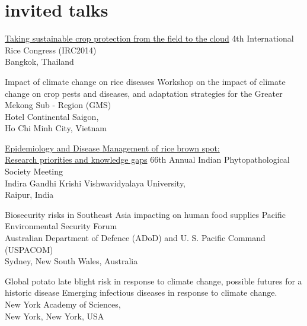 \section*{invited talks}
\begin{entrylist}
	{\href{http://figshare.com/articles/Taking_Sustainable_Crop_Protection_From_the_Field_to_the_Cloud/1225800}{Taking sustainable crop protection from the field to the cloud}}
	{}
	{4th International Rice Congress (IRC2014)\\Bangkok, Thailand}

	{Impact of climate change on rice diseases}
	{}
	{Workshop on the impact of climate change on crop pests and diseases, and adaptation strategies for the Greater Mekong Sub - Region (GMS)\\Hotel Continental Saigon,\\Ho Chi Minh City, Vietnam}

	{\href{http://figshare.com/articles/IPS_2014/1037569}{Epidemiology and Disease Management of rice brown spot:\\Research priorities and knowledge gaps}}
	{}
	{66th Annual Indian Phytopathological Society Meeting\\Indira Gandhi Krishi Vishwavidyalaya University,\\Raipur, India}

	{Biosecurity risks in Southeast Asia impacting on human food supplies}
	{}
	{Pacific Environmental Security Forum\\Australian Department of Defence (ADoD) and U. S. Pacific Command (USPACOM)\\Sydney, New South Wales, Australia}

	{Global potato late blight risk in response to climate change, possible futures for a historic disease}
  	{}
  	{Emerging infectious diseases in response to climate change.\\New York Academy of Sciences,\\New York, New York, USA}
\end{entrylist}
